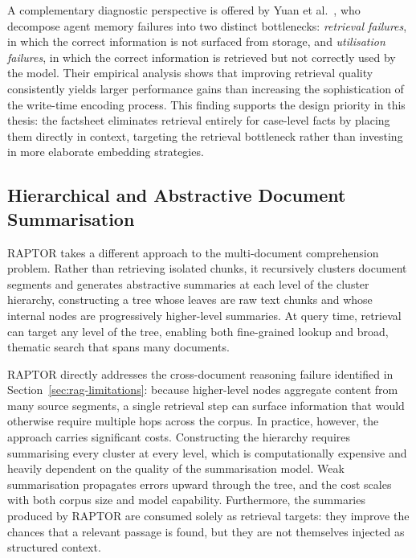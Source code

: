 A complementary diagnostic perspective is offered by Yuan et al.\ \cite{yuan2026diagnosingretrievalvsutilization}, who decompose agent memory failures into two distinct bottlenecks: \emph{retrieval failures}, in which the correct information is not surfaced from storage, and \emph{utilisation failures}, in which the correct information is retrieved but not correctly used by the model. Their empirical analysis shows that improving retrieval quality consistently yields larger performance gains than increasing the sophistication of the write-time encoding process. This finding supports the design priority in this thesis: the factsheet eliminates retrieval entirely for case-level facts by placing them directly in context, targeting the retrieval bottleneck rather than investing in more elaborate embedding strategies.

\subsection{Hierarchical and Abstractive Document Summarisation}

RAPTOR \cite{sarthi2024raptorrecursiveabstractiveprocessing} takes a different approach to the multi-document comprehension problem. Rather than retrieving isolated chunks, it recursively clusters document segments and generates abstractive summaries at each level of the cluster hierarchy, constructing a tree whose leaves are raw text chunks and whose internal nodes are progressively higher-level summaries. At query time, retrieval can target any level of the tree, enabling both fine-grained lookup and broad, thematic search that spans many documents.

RAPTOR directly addresses the cross-document reasoning failure identified in Section~\ref{sec:rag-limitations}: because higher-level nodes aggregate content from many source segments, a single retrieval step can surface information that would otherwise require multiple hops across the corpus. In practice, however, the approach carries significant costs. Constructing the hierarchy requires summarising every cluster at every level, which is computationally expensive and heavily dependent on the quality of the summarisation model. Weak summarisation propagates errors upward through the tree, and the cost scales with both corpus size and model capability. Furthermore, the summaries produced by RAPTOR are consumed solely as retrieval targets: they improve the chances that a relevant passage is found, but they are not themselves injected as structured context.

